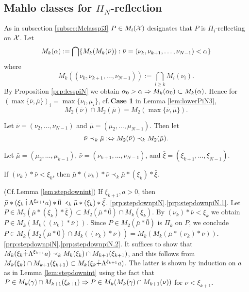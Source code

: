 \documentclass{article}
\begin{document}
\subsection{Mahlo classes for $\Pi_{N}$-reflection}
As in subsection \ref{subsec:Mclasspi3}
$P\in M_{i}({\cal X})$ designates that $P$ is $\Pi_{i}$-reflecting on ${\cal X}$.
Let
\[
M_{k}(\alpha):=\bigcap\{M_{k}(M_{k}(\bar{\nu})) : \bar{\nu}=(\nu_{k},\nu_{k+1},\ldots,\nu_{N-1})<\alpha\}
\]
where
\[
M_{k}((\nu_{k},\nu_{k+1},\ldots,\nu_{N-1})):=\bigcap_{i\geq k}M_{i}(\nu_{i}).
\]
By Proposition \ref{prp:lesspiN} we obtain
$\alpha_{0}>\alpha \Rightarrow M_{k}(\alpha_{0})\subset M_{k}(\alpha)$.
Hence for $(\max\{\bar{\nu},\bar{\mu}\})_{i}=\max\{\nu_{i},\mu_{i}\}$, cf.\,\textbf{Case 1} in Lemma \ref{lem:lowerPiN3}, 
\[
M_{2}(\bar{\nu})\cap M_{2}(\bar{\mu})=M_{2}(\max\{\bar{\nu},\bar{\mu}\}).
\]

Let $\bar{\nu}=(\nu_{2},\ldots,\nu_{N-1})$ and $\bar{\mu}=(\mu_{2},\ldots,\mu_{N-1})$.
Then let
\[
\bar{\nu}\prec_{k}\bar{\mu}:\Leftrightarrow M_{2}(\bar{\nu})\prec_{k} M_{2}(\bar{\mu}).
\]


\bprp\label{prp:stepdownpiN}
Let $\bar{\mu}=(\mu_{2},\ldots,\mu_{k-1})$, $\bar{\nu}=(\nu_{k+1},\ldots,\nu_{N-1})$, and
$\bar{\xi}=(\xi_{k+1},\ldots,\xi_{N-1})$.
\benu
\item\label{prp:stepdownpiN.1}
If $(\nu_{k})*\bar{\nu}<\xi_{k}$, then
$\bar{\mu}*(\nu_{k})*\bar{\nu}\prec_{k}\bar{\mu}*(\xi_{k})*\bar{\xi}$.

\item\label{prp:stepdownpiN.2}
(Cf.\,Lemma \ref{lem:stepdownint})
If $\xi_{k+1},a>0$, then
$\bar{\mu}*(\xi_{k}\dot{+}\Lambda^{\xi_{k+1}}a)*\bar{0}\prec_{k}\bar{\mu}*(\xi_{k})*\bar{\xi}$.
\eenu
\eprp
\bprf
\ref{prp:stepdownpiN}.\ref{prp:stepdownpiN.1}.
Let $P\in M_{2}(\bar{\mu}*(\xi_{k})*\bar{\xi})\subset M_{2}(\bar{\mu}*\bar{0})\cap M_{k}(\xi_{k})$.
By $(\nu_{k})*\bar{\nu}<\xi_{k}$ we obtain $P\in M_{k}(M_{k}((\nu_{k})*\bar{\nu}))$.
Since $P\in M_{2}(\bar{\mu}*\bar{0})$ is $\Pi_{k}$ on $P$,
we conclude $P\in M_{k}(M_{2}(\bar{\mu}*\bar{0}) \cap M_{k}((\nu_{k})*\bar{\nu}))=M_{k}(M_{k}(\bar{\mu}*(\nu_{k})*\bar{\nu}))$.
\\
\ref{prp:stepdownpiN}.\ref{prp:stepdownpiN.2}.
It suffices to show that
$M_{k}(\xi_{k}\dot{+}\Lambda^{\xi_{k+1}}a)\prec_{k}M_{k}(\xi_{k})\cap M_{k+1}(\xi_{k+1})$, and this follows from
$M_{k}(\xi_{k})\cap M_{k+1}(\xi_{k+1}) \subset M_{k}(\xi_{k}\dot{+}\Lambda^{\xi_{k+1}}a)$.
The latter is shown by induction on $a$ as in Lemma \ref{lem:stepdownint}
using the fact that $P\in M_{k}(\gamma)\cap M_{k+1}(\xi_{k+1})\Rightarrow P\in M_{k}(M_{k}(\gamma)\cap M_{k+1}(\nu))$ for $\nu<\xi_{k+1}$.
\eprf
\end{document}
